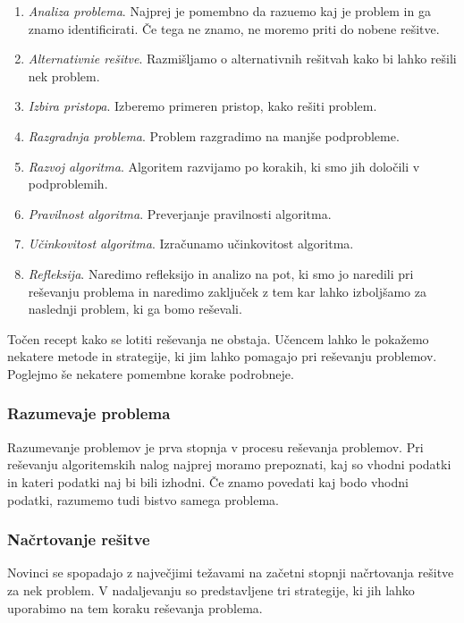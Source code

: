 \begin{enumerate}
\item \emph{Analiza problema}. Najprej je pomembno da razuemo kaj je
  problem in ga znamo identificirati. Če tega ne znamo, ne moremo
  priti do nobene rešitve.
\item \emph{Alternativnie rešitve}. Razmišljamo o alternativnih
  rešitvah kako bi lahko rešili nek problem.
\item \emph{Izbira pristopa}. Izberemo primeren pristop, kako rešiti problem.
\item \emph{Razgradnja problema}. Problem razgradimo na manjše podprobleme.
\item \emph{Razvoj algoritma}. Algoritem razvijamo po korakih, ki smo
  jih določili v podproblemih.
\item \emph{Pravilnost algoritma}. Preverjanje pravilnosti algoritma.
\item \emph{Učinkovitost algoritma}. Izračunamo učinkovitost algoritma.
\item \emph{Refleksija}. Naredimo refleksijo in analizo na pot, ki smo
  jo naredili pri reševanju problema in naredimo zaključek z tem kar
  lahko izboljšamo za naslednji problem, ki ga bomo reševali.
\end{enumerate}

Točen recept kako se lotiti reševanja ne obstaja. Učencem lahko le
pokažemo nekatere metode in strategije, ki jim lahko pomagajo pri
reševanju problemov. Poglejmo še nekatere pomembne korake podrobneje.

\subsubsection{Razumevaje problema}
\label{sec:razumevanje problema}

Razumevanje problemov je prva stopnja v procesu reševanja
problemov. Pri reševanju algoritemskih nalog najprej moramo
prepoznati, kaj so vhodni podatki in kateri podatki naj bi bili
izhodni. Če znamo povedati kaj bodo vhodni podatki, razumemo tudi
bistvo samega problema.

\subsubsection{Načrtovanje rešitve}
\label{sec:načrtovanje_rešitve}

Novinci se spopadajo z največjimi težavami na začetni stopnji
načrtovanja rešitve za nek problem. V nadaljevanju so predstavljene
tri strategije, ki jih lahko uporabimo na tem koraku reševanja
problema.

